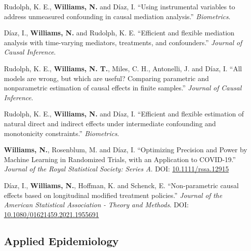 \documentclass[12pt,letterpaper]{report}
\begin{document}
\begin{tablist}
    \item[2024] \tab Rudolph, K. E., \textbf{Williams, N.} and Díaz, I. \enquote{Using instrumental variables to address unmeasured confounding in causal mediation analysis.} \textit{Biometrics}.
    
    \item[2023] \tab Díaz, I., \textbf{Williams, N.} and Rudolph, K. E. \enquote{Efficient and flexible mediation analysis with time-varying mediators, treatments, and confounders.} \textit{Journal of Causal Inference}.
    
    \item[2023] \tab Rudolph, K. E., \textbf{Williams, N. T.}, Miles, C. H., Antonelli, J. and Díaz, I. \enquote{All models are wrong, but which are useful? Comparing parametric and nonparametric estimation of causal effects in finite samples.} \textit{Journal of Causal Inference}.
    
    \item[2023] \tab Rudolph, K. E., \textbf{Williams, N.} and Díaz, I. \enquote{Efficient and flexible estimation of natural direct and indirect effects under intermediate confounding and monotonicity constraints.} \textit{Biometrics}.
    
        \item[2022] \tab \textbf{Williams, N.}, Rosenblum, M. and Díaz, I. \enquote {Optimizing Precision and Power by Machine Learning in Randomized Trials, with an Application to COVID-19.} \textit{Journal of the Royal Statistical Society: Series A}. DOI: \href{https://doi.org/10.1111/rssa.12915}{10.1111/rssa.12915}
    
       \item[2021] \tab Díaz, I., \textbf{Williams, N.}, Hoffman, K. and Schenck, E. \enquote{Non-parametric causal effects based on longitudinal modified treatment policies.} \textit{Journal of the American Statistical Association - Theory and Methods}. DOI: \href{https://doi.org/10.1080/01621459.2021.1955691}{10.1080/01621459.2021.1955691}
       
    \end{tablist}

    \subsection*{Applied Epidemiology}
\end{document}
